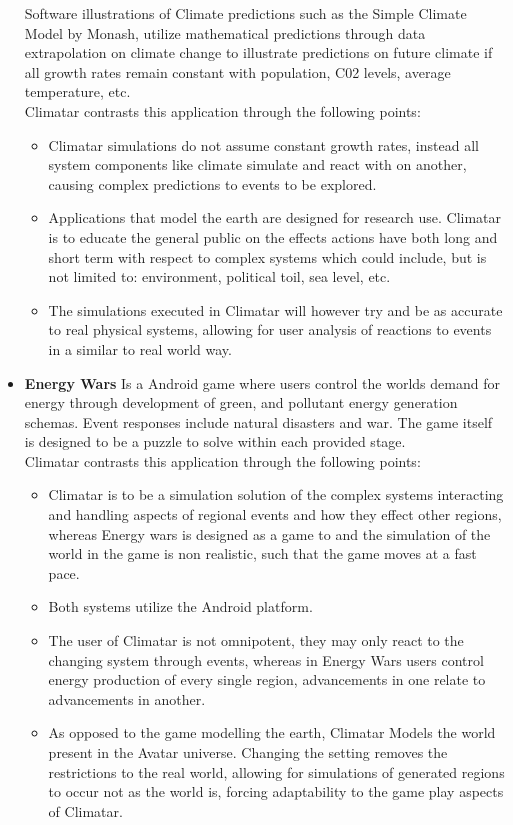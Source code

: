 \documentclass[]{article}
\begin{document}
\begin{itemize}
		Software illustrations of Climate predictions such as the Simple Climate Model by Monash, utilize mathematical predictions through data extrapolation on climate change to illustrate predictions on future climate if all growth rates remain constant with population, C02 levels, average temperature, etc\cite{ClimM}.\\
	Climatar contrasts this application through the following points:
		\begin{itemize}
			\item Climatar simulations do not assume constant growth rates, instead all system components like climate simulate and react with on another, causing complex predictions to events to be explored.
			\item Applications that model the earth are designed for  research use. Climatar is to educate the general public on the effects actions have both long and short term with respect to complex systems which could include, but is not limited to: environment, political toil, sea level, etc.
			\item The simulations executed in Climatar will however try and be as accurate to real physical systems, allowing for user analysis of reactions to events in a similar to real world way.
		\end{itemize}	 

	\item \textbf{Energy Wars} 
		Is a Android game\cite{EW} where users control the worlds demand for energy through development of green, and pollutant energy generation schemas. Event responses include natural disasters and war. The game itself is designed to be a puzzle to solve within each provided stage.\\
		Climatar contrasts this application through the following points:
		\begin{itemize}
			\item Climatar is to be a simulation solution of the complex systems interacting and handling aspects of regional events and how they effect other regions, whereas Energy wars is designed as a game to and the simulation of the world in the game is non realistic, such that the game moves at a fast pace.
			\item Both systems utilize the Android platform.
			\item The user of Climatar is not omnipotent, they may only react to the changing system through events, whereas in Energy Wars users control energy production of every single region, advancements in one relate to advancements in another.
			\item As opposed to the game modelling the earth, Climatar Models the world present in the Avatar universe. Changing the setting removes the restrictions to the real world, allowing for  simulations of generated regions to occur not as the world is, forcing adaptability to the game play aspects of Climatar.
		\end{itemize}
\end{itemize}
\end{document}
